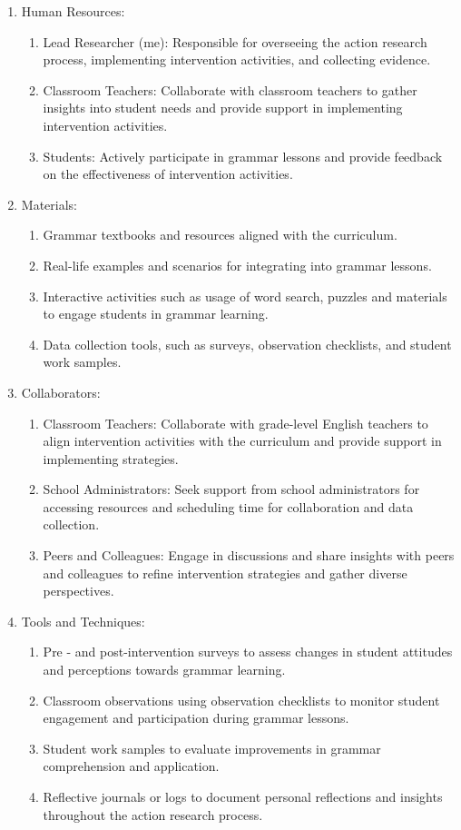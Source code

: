 \documentclass[12pt, a4paaper]{article}
\begin{document}
\begin{enumerate}
\begin{enumerate}
    \item Human Resources:
    \begin{enumerate}
\item Lead Researcher (me): Responsible for overseeing the action research process, implementing intervention activities, and collecting evidence.
\item Classroom Teachers: Collaborate with classroom teachers to gather insights into student needs and provide support in implementing intervention activities.
\item Students: Actively participate in grammar lessons and provide feedback on the effectiveness of intervention activities.
\end{enumerate}

    \item Materials:
    \begin{enumerate}
\item Grammar textbooks and resources aligned with the curriculum.
\item Real-life examples and scenarios for integrating into grammar lessons.
\item Interactive activities such as usage of word search, puzzles and materials to engage students in grammar learning.
\item Data collection tools, such as surveys, observation checklists, and student work samples.
\end{enumerate}

    \item Collaborators:
    \begin{enumerate}
\item Classroom Teachers: Collaborate with grade-level English teachers to align intervention activities with the curriculum and provide support in implementing strategies.
\item School Administrators: Seek support from school administrators for accessing resources and scheduling time for collaboration and data collection.
\item Peers and Colleagues: Engage in discussions and share insights with peers and colleagues to refine intervention strategies and gather diverse perspectives.
\end{enumerate}

    \item Tools and Techniques:
    \begin{enumerate}
\item Pre - and post-intervention surveys to assess changes in student attitudes and perceptions towards grammar learning.
\item Classroom observations using observation checklists to monitor student engagement and participation during grammar lessons.
\item Student work samples to evaluate improvements in grammar comprehension and application.
\item Reflective journals or logs to document personal reflections and insights throughout the action research process.
\end{enumerate}


\end{enumerate}
\end{enumerate}
\end{document}
